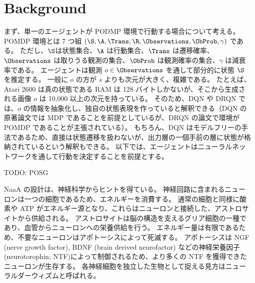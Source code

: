 \section{Background}

まず、単一のエージェントが PODMP 環境で行動する場合について考える。
POMDP 環境とは 7 つ組 $(\S, \A, \Trans, \R, \Observations, \ObProb, \gamma)$ である。
ただし、$\S$は状態集合、$\A$ は行動集合、$\Trans$ は遷移確率、$\Observations$ は取りうる観測の集合、$\ObProb$ は観測確率の集合、$\gamma$ は減衰率である。
エージェントは観測 $o \in \Observations$ を通して部分的に状態 $\S$ を推定する。
一般に $o$ の方が $s$ よりも次元が大きく、複雑である。
たとえば、Atari 2600 は真の状態である RAM は 128 バイトしかないが、そこから生成される画像 $o$ は 10,000 以上の次元を持っている。
そのため、DQN や DRQN では、$o$ の情報を抽象化し、独自の状態表現を作っていると解釈できる（DQN の原著論文では MDP であることを前提としているが、DRQN の論文で環境が POMDP であることが主張されている）。
もちろん、DQN はモデルフリーの手法であるため、直接は状態遷移を扱わないが、出力層の一個手前の層に状態が格納されているという解釈もできる\citep{zahavy2016graying}。
以下では、エージェントはニューラルネットワークを通して行動を決定することを前提とする。

TODO: POSG

NaaA の設計は、神経科学からヒントを得ている。
神経回路に含まれるニューロンは一つの細胞であるため、エネルギーを消費する。
通常の細胞と同様に酸素や ATP がエネルギー源となり、これらはニューロンと接続した、アストロサイトから供給される。
アストロサイトは脳の構造を支えるグリア細胞の一種であり、血管からニューロンへの栄養供給を行う。
エネルギー量は有限であるため、不要なニューロンはアポトーシスによって死滅する。
アポトーシスは NGF (nerve growth factor), BDNF (brain derived neurofactor) などの神経栄養因子(neurotorophin; NTF)によって制御されるため、より多くの NTF を獲得できたニューロンが生存する。
各神経細胞を独立した生物として捉える見方はニューラルダーウィズム\citep{edelman1987neural}と呼ばれる。

